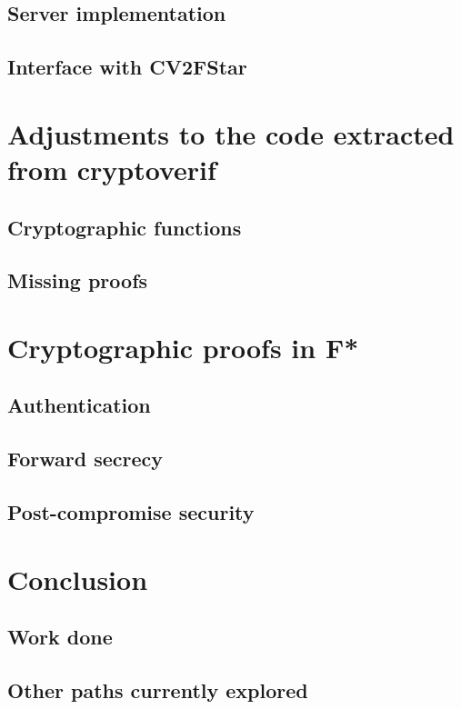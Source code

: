 \documentclass[a4paper, 10pt]{article}
\begin{document}
	\subsection{Server implementation}

	\subsection{Interface with CV2FStar}

\section{Adjustments to the code extracted from cryptoverif}
	\subsection{Cryptographic functions}

	\subsection{Missing proofs}

\section{Cryptographic proofs in F*}
	\subsection{Authentication}

	\subsection{Forward secrecy}

	\subsection{Post-compromise security}

\section{Conclusion}
	\subsection{Work done}

	\subsection{Other paths currently explored}
\end{document}
